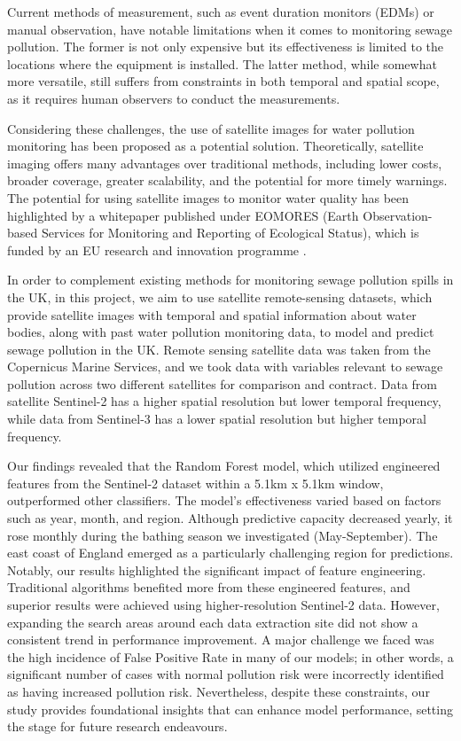 \documentclass[a4paper,11pt]{report}
\begin{document}
Current methods of measurement, such as event duration monitors (EDMs) or manual observation, have notable limitations when it comes to monitoring sewage pollution. The former is not only expensive but its effectiveness is limited to the locations where the equipment is installed. The latter method, while somewhat more versatile, still suffers from constraints in both temporal and spatial scope, as it requires human observers to conduct the measurements.

Considering these challenges, the use of satellite images for water pollution monitoring has been proposed as a potential solution. Theoretically, satellite imaging offers many advantages over traditional methods, including lower costs, broader coverage, greater scalability, and the potential for more timely warnings. The potential for using satellite images to monitor water quality has been highlighted by a whitepaper published under EOMORES (Earth Observation-based Services for Monitoring and Reporting of Ecological Status), which is funded by an EU research and innovation programme \citep*{papathanasopoulou2019satellite}.

In order to complement existing methods for monitoring sewage pollution spills in the UK, in this project, we aim to use satellite remote-sensing datasets, which provide satellite images with temporal and spatial information about water bodies, along with past water pollution monitoring data, to model and predict sewage pollution in the UK. Remote sensing satellite data was taken from the Copernicus Marine Services, and we took data with variables relevant to sewage pollution across two different satellites for comparison and contract. Data from satellite Sentinel-2 has a higher spatial resolution but lower temporal frequency, while data from Sentinel-3 has a lower spatial resolution but higher temporal frequency.

Our findings revealed that the Random Forest model, which utilized engineered features from the Sentinel-2 dataset within a 5.1km x 5.1km window, outperformed other classifiers. The model's effectiveness varied based on factors such as year, month, and region. Although predictive capacity decreased yearly, it rose monthly during the bathing season we investigated (May-September). The east coast of England emerged as a particularly challenging region for predictions. Notably, our results highlighted the significant impact of feature engineering. Traditional algorithms benefited more from these engineered features, and superior results were achieved using higher-resolution Sentinel-2 data. However, expanding the search areas around each data extraction site did not show a consistent trend in performance improvement. A major challenge we faced was the high incidence of False Positive Rate in many of our models; in other words, a significant number of cases with normal pollution risk were incorrectly identified as having increased pollution risk. Nevertheless, despite these constraints, our study provides foundational insights that can enhance model performance, setting the stage for future research endeavours.
\end{document}
